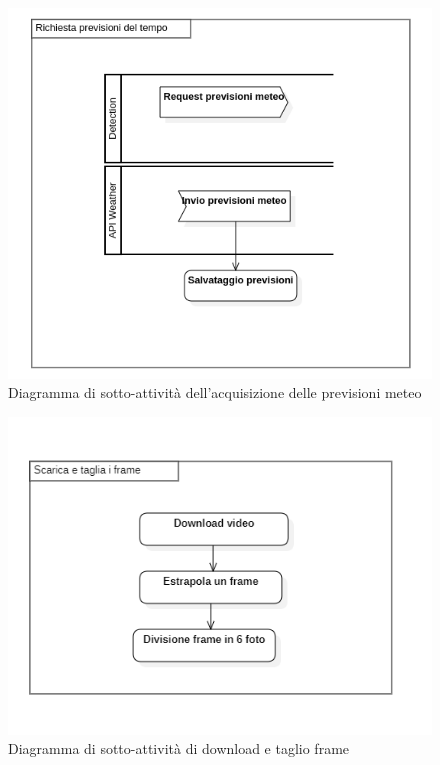 \begin{figure}[H]
  \begin{center}
    \includegraphics[scale=0.8]{../immagini/diag_PB/previsioni_del_tempo.png}
    \caption{Diagramma di sotto-attività dell'acquisizione delle previsioni meteo}
  \end{center}
\end{figure}
\begin{figure}[H]
  \begin{center}
    \includegraphics[scale=0.65]{../immagini/diag_PB/download_e_cut_frames.png}
    \caption{Diagramma di sotto-attività di download e taglio frame}
  \end{center}
\end{figure}
